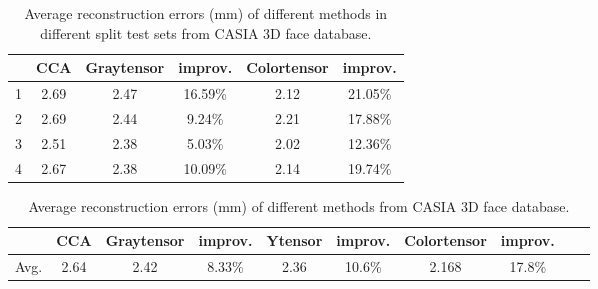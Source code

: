 \begin{table}[htbp]
\centering
\vfill 
\caption{Average reconstruction errors (mm) of different methods in different split test sets from CASIA 3D face database.}
\label{table:Re3}%
\begin{tabular}[b]{|l||c|c|c|c|c|}
\hline
 &  CCA & Graytensor & improv. & Colortensor & improv.\\
\hline
\hline
 1  & 2.69 & 2.47 & 16.59\% & 2.12 & 21.05\%  \\   
\hline
 2  & 2.69 & 2.44 & 9.24\% & 2.21 & 17.88\%   \\
\hline
 3  & 2.51 & 2.38 & 5.03\% & 2.02 & 12.36\%   \\
\hline
 4  & 2.67 & 2.38 & 10.09\% & 2.14 & 19.74\%   \\
\hline
\end{tabular}%
\end{table}%


\begin{table}[htbp]
\centering
\vfill 
\caption{Average reconstruction errors (mm) of different methods from CASIA 3D face database.}
\label{table:Re3_2}%
\begin{tabular}[b]{|l||c|c|c|c|c|c|c|c|c|}

\hline
     & CCA & Graytensor & improv.& Ytensor & improv. &Colortensor & improv. \\
\hline
\hline
Avg. & 2.64 & 2.42 & 8.33\% & 2.36 & 10.6\% & 2.168 & 17.8\%  \\

\hline

\end{tabular}
\end{table}%
